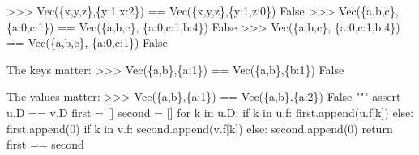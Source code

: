 \documentclass[
  letterpaper,
  DIV=11,
  numbers=noendperiod]{scrartcl}
\newenvironment{Shaded}{\begin{snugshade}}{\end{snugshade}}
\newcommand{\CommentTok}[1]{\textcolor[rgb]{0.37,0.37,0.37}{#1}}
\newcommand{\ControlFlowTok}[1]{\textcolor[rgb]{0.00,0.23,0.31}{#1}}
\newcommand{\DecValTok}[1]{\textcolor[rgb]{0.68,0.00,0.00}{#1}}
\newcommand{\KeywordTok}[1]{\textcolor[rgb]{0.00,0.23,0.31}{#1}}
\newcommand{\NormalTok}[1]{\textcolor[rgb]{0.00,0.23,0.31}{#1}}
\newcommand{\OperatorTok}[1]{\textcolor[rgb]{0.37,0.37,0.37}{#1}}
\begin{document}
\begin{Shaded}
\begin{Highlighting}[numbers=left,,]
\CommentTok{    \textgreater{}\textgreater{}\textgreater{} Vec(\{\textquotesingle{}x\textquotesingle{},\textquotesingle{}y\textquotesingle{},\textquotesingle{}z\textquotesingle{}\},\{\textquotesingle{}y\textquotesingle{}:1,\textquotesingle{}x\textquotesingle{}:2\}) == Vec(\{\textquotesingle{}x\textquotesingle{},\textquotesingle{}y\textquotesingle{},\textquotesingle{}z\textquotesingle{}\},\{\textquotesingle{}y\textquotesingle{}:1,\textquotesingle{}z\textquotesingle{}:0\})}
\CommentTok{    False}
\CommentTok{    \textgreater{}\textgreater{}\textgreater{} Vec(\{\textquotesingle{}a\textquotesingle{},\textquotesingle{}b\textquotesingle{},\textquotesingle{}c\textquotesingle{}\}, \{\textquotesingle{}a\textquotesingle{}:0,\textquotesingle{}c\textquotesingle{}:1\}) == Vec(\{\textquotesingle{}a\textquotesingle{},\textquotesingle{}b\textquotesingle{},\textquotesingle{}c\textquotesingle{}\}, \{\textquotesingle{}a\textquotesingle{}:0,\textquotesingle{}c\textquotesingle{}:1,\textquotesingle{}b\textquotesingle{}:4\})}
\CommentTok{    False}
\CommentTok{    \textgreater{}\textgreater{}\textgreater{} Vec(\{\textquotesingle{}a\textquotesingle{},\textquotesingle{}b\textquotesingle{},\textquotesingle{}c\textquotesingle{}\}, \{\textquotesingle{}a\textquotesingle{}:0,\textquotesingle{}c\textquotesingle{}:1,\textquotesingle{}b\textquotesingle{}:4\}) == Vec(\{\textquotesingle{}a\textquotesingle{},\textquotesingle{}b\textquotesingle{},\textquotesingle{}c\textquotesingle{}\}, \{\textquotesingle{}a\textquotesingle{}:0,\textquotesingle{}c\textquotesingle{}:1\})}
\CommentTok{    False}

\CommentTok{    The keys matter:}
\CommentTok{    \textgreater{}\textgreater{}\textgreater{} Vec(\{\textquotesingle{}a\textquotesingle{},\textquotesingle{}b\textquotesingle{}\},\{\textquotesingle{}a\textquotesingle{}:1\}) == Vec(\{\textquotesingle{}a\textquotesingle{},\textquotesingle{}b\textquotesingle{}\},\{\textquotesingle{}b\textquotesingle{}:1\})}
\CommentTok{    False}

\CommentTok{    The values matter:}
\CommentTok{    \textgreater{}\textgreater{}\textgreater{} Vec(\{\textquotesingle{}a\textquotesingle{},\textquotesingle{}b\textquotesingle{}\},\{\textquotesingle{}a\textquotesingle{}:1\}) == Vec(\{\textquotesingle{}a\textquotesingle{},\textquotesingle{}b\textquotesingle{}\},\{\textquotesingle{}a\textquotesingle{}:2\})}
\CommentTok{    False}
\CommentTok{    """}
    \ControlFlowTok{assert}\NormalTok{ u.D }\OperatorTok{==}\NormalTok{ v.D}
\NormalTok{    first }\OperatorTok{=}\NormalTok{ []}
\NormalTok{    second }\OperatorTok{=}\NormalTok{ []}
    \ControlFlowTok{for}\NormalTok{ k }\KeywordTok{in}\NormalTok{ u.D:}
        \ControlFlowTok{if}\NormalTok{ k }\KeywordTok{in}\NormalTok{ u.f:}
\NormalTok{            first.append(u.f[k])}
        \ControlFlowTok{else}\NormalTok{:}
\NormalTok{            first.append(}\DecValTok{0}\NormalTok{)}
        \ControlFlowTok{if}\NormalTok{ k }\KeywordTok{in}\NormalTok{ v.f:}
\NormalTok{            second.append(v.f[k])}
        \ControlFlowTok{else}\NormalTok{:}
\NormalTok{            second.append(}\DecValTok{0}\NormalTok{)}
    \ControlFlowTok{return}\NormalTok{ first }\OperatorTok{==}\NormalTok{ second}


\end{Highlighting}
\end{Shaded}
\end{document}
